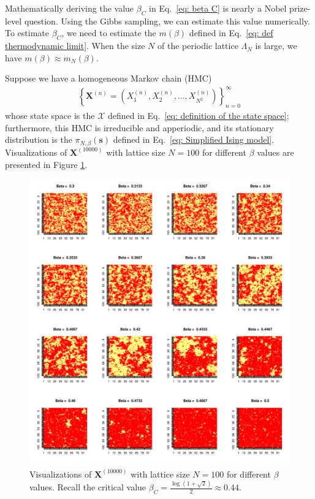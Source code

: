 \documentclass[11pt,letterpaper, leqno]{article}
\numberwithin{equation}{section}
\numberwithin{theorem}{section}
\numberwithin{lemma}{section}
\numberwithin{corollary}{section}
\numberwithin{definition}{section}
\numberwithin{proposition}{section}
\numberwithin{remark}{section}
\numberwithin{example}{section}
\begin{document}
Mathematically deriving the value $\beta_C$ in Eq.~\eqref{eq: beta C} is nearly a Nobel prize-level question. Using the Gibbs sampling, we can estimate this value numerically. To estimate $\beta_C$, we need to estimate the $m(\beta)$ defined in Eq.~\eqref{eq: def thermodynamic limit}. When the size $N$ of the periodic lattice $\Lambda_N$ is large, we have $m(\beta)\approx m_N(\beta)$.

Suppose we have a homogeneous Markov chain (HMC) 
\begin{align}\label{eq: such a MC}
    \left\{ \boldsymbol{X}^{(n)}=\left( X_1^{(n)}, X_2^{(n)},\ldots, X_{N^2}^{(n)} \right) \right\}_{n=0}^\infty
\end{align}
whose state space is the $\mathcal{X}$ defined in Eq.~\eqref{eq: definition of the state space}; furthermore, this HMC is irreducible and apperiodic, and its stationary distribution is the $\pi_{N,\beta}(\boldsymbol{s})$ defined in Eq.~\eqref{eq: Simplified Ising model}. Visualizations of $\boldsymbol{X}^{(10000)}$ with lattice size $N=100$ for different $\beta$ values are presented in Figure \ref{fig: spin configurations for different temperatures}.

\begin{figure}
    \centering
    \includegraphics[scale=0.65]{Ising100_16by16.pdf}
    \caption{Visualizations of $\boldsymbol{X}^{(10000)}$ with lattice size $N=100$ for different $\beta$ values. Recall the critical value $\beta_C=\frac{\log(1+\sqrt{2})}{2} \approx0.44$.}
    \label{fig: spin configurations for different temperatures}
\end{figure}
\end{document}
